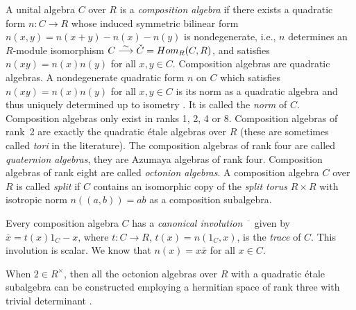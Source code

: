 \documentclass[10pt]{amsart}
\theoremstyle{plain}
\theoremstyle{definition}
\newcommand{\can}{\overline{\phantom{x}}}
\begin{document}
A unital algebra $C$ over $R$ is  a
{\it composition algebra} if there exists a quadratic form $n \colon C \rightarrow R$
whose induced symmetric bilinear form $n(x, y)=n(x+y)-n(x)-n(y)$ is  nondegenerate, i.e., $n$ determines an $R$-module isomorphism $C
\stackrel{\sim}{\longrightarrow} \check{C} = {\rm Hom}_R (C, R)$, and  satisfies
 $n(xy) = n(x) n(y)$ for all $x, y \in C$.
 Composition algebras are quadratic algebras. A nondegenerate quadratic form $n$ on  $C$
 which satisfies $n(xy)=n(x)n(y)$ for all $x,y \in C$ is its norm as a quadratic algebra and thus uniquely determined up to isometry \cite{P2}. It
is called the {\it norm} of  $C$.  Composition algebras only
exist in ranks 1, 2, 4 or 8.  Composition algebras of rank~2 are exactly the
quadratic \'etale algebras over $R$ (these are sometimes called \emph{tori} in the literature).
The composition algebras of rank four are called \emph{quaternion algebras}, they are  Azumaya algebras of rank four.
Composition algebras of rank eight are called {\it octonion algebras}.  A composition algebra $C$ over $R$ is called \emph{split} if $C$ contains an isomorphic copy of the \emph{split torus} $R\times R$ with isotropic norm $n((a,b))=ab$ as a composition subalgebra.

 Every composition algebra $C$ has a {\it canonical involution} $\can$ given by
$\overline{x} = t(x)1_C - x$, where $t \colon C \rightarrow R$, $t(x) = n (1_C, x)$,
is the {\it trace} of $C$. This involution is scalar.  We know that $n(x)=x\bar x$ for all $x\in C$.


 When $2\in R^\times$, then all the octonion algebras over $R$ with a quadratic \'etale subalgebra can be constructed employing a hermitian space of rank three with trivial determinant \cite{T}.
\end{document}
